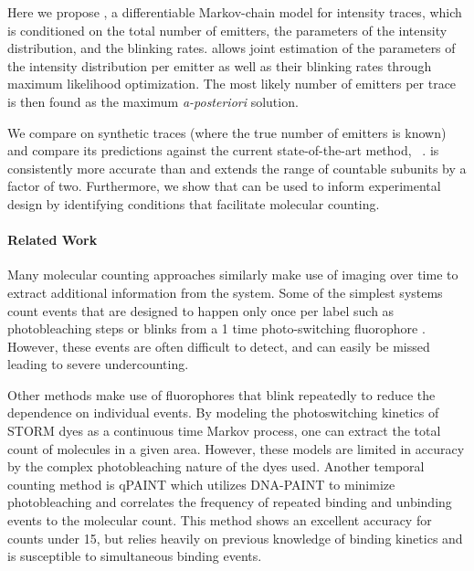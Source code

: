 Here we propose \ours, a differentiable Markov-chain model for intensity
traces, which is conditioned on the total number of emitters, the parameters of
the intensity distribution, and the blinking rates.
%
  \ours allows joint estimation of the parameters of the intensity distribution
  per emitter as well as their blinking rates through maximum likelihood
  optimization.
  The most likely number of emitters per trace is then found as the maximum
  \emph{a-posteriori} solution.

We compare \ours on synthetic traces (where the true number of emitters is
known) and compare its predictions against the current state-of-the-art method,
\lbfcs~\citep{stein_calibration-free_2021}.
%
  \ours is consistently more accurate than \lbfcs and extends the range of
  countable subunits by a factor of two.
  Furthermore, we show that \ours can be used to inform experimental design by
  identifying conditions that facilitate molecular counting.

\paragraph{Related Work}

Many molecular counting approaches similarly
  make use of imaging over time to extract additional information from the
  system. Some of the simplest systems count events that are designed to happen
  only once per label such as photobleaching steps \cite{Ulbrich_subunit_2007} or
  blinks from a 1 time photo-switching fluorophore
  \cite{gunzenhauser_quantitative_2012}. However, these events are often difficult to
  detect, and can easily be missed leading to severe undercounting.

Other methods make use of fluorophores that blink repeatedly to reduce the
dependence on individual events.
%
  By modeling the photoswitching kinetics of STORM dyes as a continuous time
  Markov process, \cite{patel_blinking_2021, rollins_stochastic_2015} one can extract the total count of molecules
  in a given area. However, these models are limited in accuracy by the complex
  photobleaching nature of the dyes used. Another temporal counting method is
  qPAINT \cite{jungmann_quantitative_2016} which utilizes DNA-PAINT to minimize photobleaching and
  correlates the frequency of repeated binding and unbinding events to the
  molecular count. This method shows an excellent accuracy for counts under 15,
  but relies heavily on previous knowledge of binding kinetics and is
  susceptible to simultaneous binding events.

